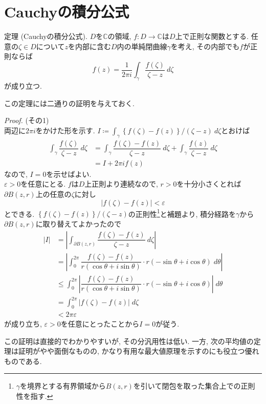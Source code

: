 \documentclass{jsarticle}
\newcommand{\C}{\mathbb{C}}%
\renewenvironment{proof}[1][Proof]{%
\begin{proofbox}%
\textit{#1. }\ignorespaces
}{%
\hfill\qedsymbol%
\end{proofbox}%
}
\begin{document}
\section{Cauchyの積分公式}
\begin{thm}{定理 (Cauchyの積分公式).}
$D$を$\C$の領域, $f\colon D\to \C$は$D$上で正則な関数とする. 任意の$\zeta\in D$について$z$を内部に含む$D$内の単純閉曲線$\gamma$を考え, その内部でも$f$が正則ならば
\[
f(z)=\frac{1}{2\pi i}\int_{\gamma}\dfrac{f(\zeta)}{\zeta-z}\:d\zeta
\]
が成り立つ.
\end{thm}
この定理には二通りの証明を与えておく.
\begin{proof}(その1)\\
両辺に$2\pi i$をかけた形を示す. $I\coloneq\int_{\gamma}{\left\{f(\zeta)-f(z)\right\}}/{(\zeta-z)}\:d\zeta$とおけば
\begin{align*}
\int_{\gamma}\dfrac{f(\zeta)}{\zeta-z}\:d\zeta &= \int_{\gamma}\dfrac{f(\zeta)-f(z)}{\zeta-z}\:d\zeta+\int_{\gamma}\dfrac{f(z)}{\zeta-z}\:d\zeta \\
& = I+2\pi if(z)
\end{align*}
なので, $I=0$を示せばよい. \\
$\varepsilon>0$を任意にとる. $f$は$D$上正則より連続なので, $r>0$を十分小さくとれば$\partial B(z, r)$上の任意の$\zeta$に対し
\[
\left|f(\zeta)-f(z)\right|<\varepsilon
\]
とできる. $\left\{f(\zeta)-f(z)\right\}/\left(\zeta-z\right)$の正則性\footnote{$\gamma$を境界とする有界領域から$B(z, r)$を引いて閉包を取った集合上での正則性を指す.}と補題より, 積分経路を$\gamma$から$\partial B(z,r)$に取り替えてよかったので
\begin{align*}
|I| & = \left|\int_{\partial B(z,r)}\dfrac{f(\zeta)-f(z)}{\zeta-z}\:d\zeta\right|\\
   & = \left|\int_{0}^{2\pi} \dfrac{f(\zeta)-f(z)}{r(\cos\theta+i\sin\theta)}\cdot r(-\sin\theta+i\cos\theta)\;d\theta  \right|\\
   & \le \int_{0}^{2\pi} \left|\dfrac{f(\zeta)-f(z)}{r(\cos\theta+i\sin\theta)}\cdot r(-\sin\theta+i\cos\theta)\right|\;d\theta\\
  & = \int_{0}^{2\pi} \left|f(\zeta)-f(z)\right|\;d\zeta\\
  & < 2\pi\varepsilon
\end{align*}
が成り立ち, $\varepsilon>0$を任意にとったことから$I=0$が従う.
\end{proof}
\vspace{1em}
この証明は直接的でわかりやすいが, その分汎用性は低い. 一方, 次の平均値の定理は証明がやや面倒なものの, かなり有用な最大値原理を示すのにも役立つ優れものである.
\end{document}

